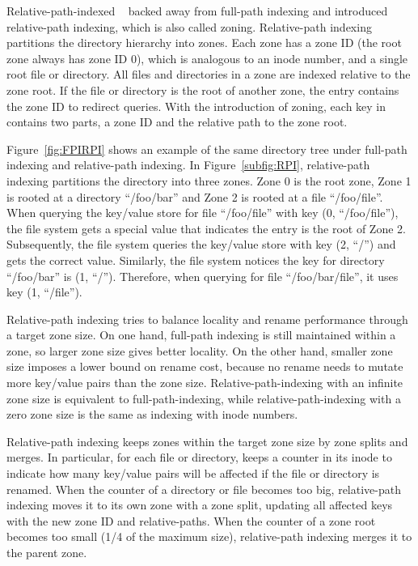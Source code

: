 Relative-path-indexed \betrfs~\citep{betrfs2,betrfs2tos} backed away from
full-path indexing and introduced relative-path indexing,
which is also called zoning.
Relative-path indexing partitions the directory hierarchy into zones.
Each zone has a zone ID (the root zone always has zone ID 0), which is analogous
to an inode number, and a single root file or directory.
All files and directories in a zone are indexed relative to the zone root.
If the file or directory is the root of another zone, the entry contains the
zone ID to redirect queries.
With the introduction of zoning, each key in \betrfs contains two parts,
a zone ID and the relative path to the zone root.

Figure~\ref{fig:FPIRPI} shows an example of the same directory tree under
full-path indexing and relative-path indexing.
In Figure~\ref{subfig:RPI}, relative-path indexing partitions the directory
into three zones.
Zone 0 is the root zone, Zone 1 is rooted at a directory ``/foo/bar'' and
Zone 2 is rooted at a file ``/foo/file''.
When querying the key/value store for file ``/foo/file'' with key
(0, ``/foo/file''), the file system gets a special value that
indicates the entry is the root of Zone 2.
Subsequently, the file system queries the key/value store with key (2, ``/'')
and gets the correct value.
Similarly, the file system notices the key for directory ``/foo/bar'' is
(1, ``/'').
Therefore, when querying for file ``/foo/bar/file'', it uses key (1, ``/file'').

Relative-path indexing tries to balance locality and rename performance through
a target zone size.
On one hand, full-path indexing is still maintained within a zone,
so larger zone size gives better locality.
On the other hand, smaller zone size imposes a lower bound on rename cost,
because no rename needs to mutate more key/value pairs than the zone size.
Relative-path-indexing with an infinite zone size is equivalent to
full-path-indexing, while relative-path-indexing with a zero zone size is the
same as indexing with inode numbers.

Relative-path indexing keeps zones within the target zone size by zone splits
and merges.
In particular, for each file or directory, \betrfs keeps a counter in its inode
to indicate how many key/value pairs will be affected if the file or directory
is renamed.
When the counter of a directory or file becomes too big,
relative-path indexing moves it to its own zone with a zone split,
updating all affected keys with the new zone ID and relative-paths.
When the counter of a zone root becomes too small (1/4 of the maximum
size), relative-path indexing merges it to the parent zone.


